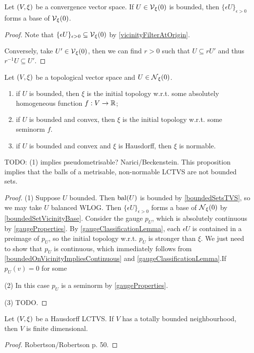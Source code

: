 \begin{lemma} \label{boundedSetVicinityBase}
Let $\left( V,\xi \right)$ be a convergence vector space. If $U\in \operatorname{\mathcal{V}}_\xi(0)$ is bounded, then $\{\epsilon U\}_{\epsilon>0}$ forms a base of $\operatorname{\mathcal{V}}_\xi(0)$.
\end{lemma}
\begin{proof}
Note that $\{\epsilon U\}_{\epsilon>0} \subseteq \operatorname{\mathcal{V}}_\xi(0)$ by \ref{vicinityFilterAtOrigin}.

Conversely, take $U'\in \operatorname{\mathcal{V}}_\xi(0)$, then we can find $r>0$ such that $U\subseteq rU'$ and thus $r^{-1}U\subseteq U'$.
\end{proof}

\begin{proposition}
Let $\left( V,\xi \right)$ be a topological vector space and $U\in\operatorname{\mathcal{N}}_\xi(0)$.
\begin{enumerate}
\item if $U$ is bounded, then $\xi$ is the initial topology w.r.t. some absolutely homogeneous function $f: V\to \mathbb{R}$;
\item if $U$ is bounded and convex, then $\xi$ is the initial topology w.r.t. some seminorm $f$.
\item if $U$ is bounded and convex and $\xi$ is Hausdorff, then $\xi$ is normable.
\end{enumerate}
\end{proposition}
TODO: (1) implies pseudometrisable? Narici/Beckenstein.
This proposition implies that the balls of a metrisable, non-normable LCTVS are not bounded sets.
\begin{proof}
(1) Suppose $U$ bounded. Then $\operatorname{bal}(U)$ is bounded by \ref{boundedSetsTVS}, so we may take $U$ balanced WLOG. Then $\{\epsilon U\}_{\epsilon >0}$ forms a base of $\operatorname{\mathcal{N}}_\xi(0)$ by \ref{boundedSetVicinityBase}. Consider the gauge $p_U$, which is absolutely continuous by \ref{gaugeProperties}. By \ref{gaugeClassificationLemma}, each $\epsilon U$ is contained in a preimage of $p_U$, so the initial topology w.r.t. $p_U$ is stronger than $\xi$. We just need to show that $p_U$ is continuous, which immediately follows from \ref{boundedOnVicinityImpliesContinuous} and \ref{gaugeClassificationLemma}.If $p_U(v) = 0$ for some 

(2) In this case $p_U$ is a seminorm by \ref{gaugeProperties}.

(3) TODO.
\end{proof}

\begin{proposition}
Let $\left( V, \xi \right)$ be a Hausdorff LCTVS. If $V$ has a totally bounded neighbourhood, then $V$ is finite dimensional.
\end{proposition}
\begin{proof}
Robertson/Robertson p. 50.
\end{proof}


